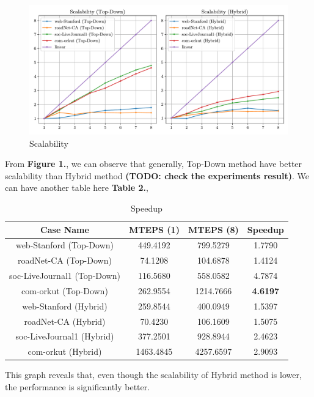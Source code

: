\documentclass[12pt]{article}
\begin{document}
\begin{figure}[!ht]
	\centering
	\includegraphics[width=\textwidth]{figures/scalability.pdf}
	\caption{Scalability}
\end{figure}

From \textbf{Figure 1.}, we can observe that generally, Top-Down method have better scalability than Hybrid method {\color{MaterialBlueGrey}\textbf{(TODO: check the experiments result)}}. We can have another table here \textbf{Table 2.},

\begin{table}[!ht]
	\centering
	\begin{tabular}{ c | c | c | c }
		\textbf{Case Name}          & \textbf{MTEPS (1)} & \textbf{MTEPS (8)} & \textbf{Speedup} \\
		\hline \hline
		web-Stanford (Top-Down)     & 449.4192           & 799.5279           & 1.7790           \\
		roadNet-CA (Top-Down)       & 74.1208            & 104.6878           & 1.4124           \\
		soc-LiveJournal1 (Top-Down) & 116.5680           & 558.0582           & 4.7874           \\
		com-orkut (Top-Down)        & 262.9554           & 1214.7666          & \textbf{4.6197}  \\
		\hline
		web-Stanford (Hybrid)       & 259.8544           & 400.0949           & 1.5397           \\
		roadNet-CA (Hybrid)         & 70.4230            & 106.1609           & 1.5075           \\
		soc-LiveJournal1 (Hybrid)   & 377.2501           & 928.8944           & 2.4623           \\
		com-orkut (Hybrid)          & 1463.4845          & 4257.6597          & 2.9093           \\
	\end{tabular}
	\caption{Speedup}
\end{table}

This graph reveals that, even though the scalability of Hybrid method is lower, the performance is significantly better.

\printbibliography
\end{document}
